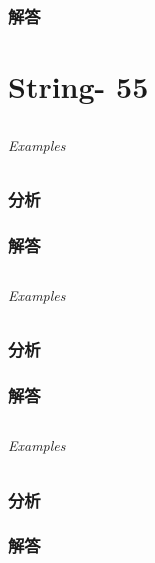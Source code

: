 \documentclass[UTF8,a4paper,12pt]{ctexbook}
\begin{document}
	\subsection{解答}
\chapter{String- 55}
	
\section{}
	
	\subparagraph{Examples}
	
	\subsection{分析}
	
	\subsection{解答}
	
\section{}
	
	\subparagraph{Examples}
	
	\subsection{分析}
	
	\subsection{解答}
	
	
\section{}
	
	\subparagraph{Examples}
	
	\subsection{分析}
	
	\subsection{解答}
	
	
\section{}
	
\end{document}
